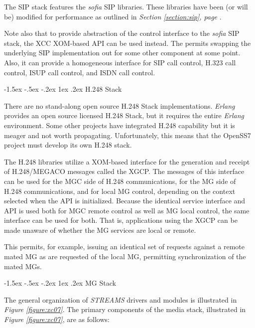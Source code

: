 \documentclass[letterpaper,final,notitlepage,twocolumn,10pt,twoside]{article}
\makeatletter
\let\normalsize = \small
\let\small = \footnotesize
\let\footnotesize = \scriptsize
\let\scriptsize = \tiny
\renewcommand\subsection{\@startsection{subsection}{2}{\z@}%
                                     {-1.5ex \@plus -.5ex \@minus -.2ex}%
                                     {1ex \@plus .2ex}%
                                     {\normalfont\normalsize\bfseries}}
\makeatother
\begin{document}
The SIP stack features the {\sl sofia} SIP libraries.  These libraries have
been (or will be) modified for performance as outlined in {\sl Section
\ref{section:sip}, page \pageref{section:sip}}.

Note also that to provide abstraction of the control interface to the {\sl
sofia} SIP stack, the XCC XOM-based API can be used instead.  The permits
swapping the underlying SIP implementation out for some other component at
some point.  Also, it can provide a homogeneous interface for SIP call
control, H.323 call control, ISUP call control, and ISDN call control.

\subsection{H.248 Stack}

There are no stand-along open source H.248 Stack implementations.  {\sl
Erlang} provides an open source licensed H.248 Stack, but it requires the
entire {\sl Erlang} environment.  Some other projects have integrated H.248
capability but it is meager and not worth propagating.  Unfortunately, this
means that the OpenSS7 project must develop its own H.248 stack.

The H.248 libraries utilize a XOM-based interface for the generation and
receipt of H.248/MEGACO messages called the XGCP.  The messages of this
interface can be used for the MGC side of H.248 communications, for the MG
side of H.248 communications, and for local MG control, depending on the
context selected when the API is initialized.  Because the identical service
interface and API is used both for MGC remote control as well as MG local
control, the same interface can be used for both.  That is, applications using
the XGCP can be made unaware of whether the MG services are local or remote.

This permits, for example, issuing an identical set of requests against a
remote mated MG as are requested of the local MG, permitting synchronization
of the mated MGs.

\subsection{MG Stack}

The general organization of {\sl STREAMS} drivers and modules is illustrated in
{\sl Figure \ref{figure:xc07}}.  The primary components of the media stack,
illustrated in {\sl Figure \ref{figure:xc07}}, are as follows:
\end{document}
